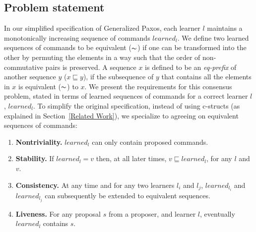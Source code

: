 \subsection{Problem statement}
In our simplified specification of Generalized Paxos, each learner $l$ maintains a monotonically increasing sequence of commands $learned_l$. We define two learned sequences of commands to be equivalent ($\thicksim$) if one can be transformed into the other by permuting the elements in a way such that the order of non-commutative pairs is preserved. A sequence $x$ is defined to be an \textit{eq-prefix} of another sequence $y$ ($x \sqsubseteq y$), if the subsequence of $y$ that contains all the elements in $x$ is equivalent ($\thicksim$) to $x$. We present the requirements for this consensus problem, stated in terms of learned sequences of commands for a correct learner $l$, $learned_l$. To simplify the original specification, instead of using c-structs (as explained in Section~\ref{Related Work}), we specialize to agreeing on equivalent sequences of commands:

\begin{enumerate}
	\item \textbf{Nontriviality.} $learned_l$ can only contain proposed commands. 
	\item \textbf{Stability.} If $learned_l = v$ then, at all later times, $v \sqsubseteq learned_l$, for any $l$ and $v$. 
	\item \textbf{Consistency.}  At any time and for any two learners $l_i$ and $l_j$, $learned_{l_i}$ and $learned_{l_j}$ can subsequently be extended to equivalent sequences.
	\item \textbf{Liveness.} For any proposal $s$ from a proposer, and learner $l$, eventually $learned_l$ contains $s$.
\end{enumerate}
